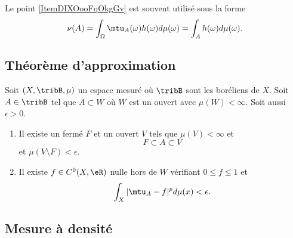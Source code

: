 \begin{remark}  \label{RemSYRMooZPBhbQ}
    Le point \ref{ItemDIXOooFqOkgGv} est souvent utilisé sous la forme
    \begin{equation}
        \nu(A)=\int_{\Omega}\mtu_A(\omega)h(\omega)d\mu(\omega)=\int_{A}h(\omega)d\mu(\omega).
    \end{equation}
\end{remark}

\subsection{Théorème d'approximation}

\begin{theorem}     \label{ThoAFXXcVa}
    Soit \( (X,\tribB,\mu)\) un espace mesuré où \( \tribB\) sont les boréliens de \( X\). Soit \( A\in \tribB\) tel que \( A\subset W\) où \( W\) est un ouvert avec \( \mu(W)<\infty\). Soit aussi \( \epsilon>0\).
    \begin{enumerate}
        \item
            Il existe un fermé \( F\) et un ouvert \( V\) tels que \( \mu(V)<\infty\) et
            \begin{equation}
                F\subset A\subset V
            \end{equation}
            et \( \mu(V\setminus F)<\epsilon\).
        \item
            Il existe \( f\in C^0(X,\eR)\) nulle hors de \( W\) vérifiant \( 0\leq f\leq 1\) et
            \begin{equation}
                \int_X| \mtu_A-f |^pd\mu(x)<\epsilon.
            \end{equation}
    \end{enumerate}
\end{theorem}

\subsection{Mesure à densité}

